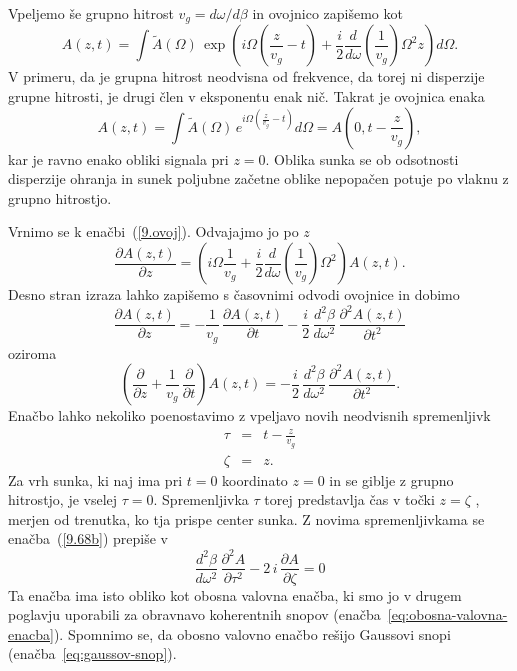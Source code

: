 Vpeljemo še grupno hitrost $v_g = d\omega/d\beta$ in ovojnico zapišemo kot
\begin{equation}
 A(z,t) = \int \tilde{A}(\Omega)\, \exp \left(i \Omega \left(\frac{z}{v_g}-t\right)+ 
 \frac{i}{2}\frac{d}{d\omega}
 \left(\frac{1}{v_g}\right)\Omega^2 z\right) d\Omega.
 \label{9.ovoj}
\end{equation}
V primeru, da je grupna hitrost neodvisna od frekvence, da torej ni disperzije grupne hitrosti, 
je drugi člen v eksponentu enak nič. Takrat je ovojnica enaka 
\begin{equation}
  A(z,t) = \int \tilde{A}(\Omega)\, e^{i \Omega \left(\frac{z}{v_g}-t\right)} d\Omega =
  A\left(0,t-\frac{z}{v_g}\right),
\end{equation}
kar je ravno enako obliki signala pri $z = 0$. Oblika sunka se ob odsotnosti 
disperzije ohranja in sunek 
poljubne začetne oblike nepopačen potuje po vlaknu z grupno hitrostjo. 

Vrnimo se k enačbi~(\ref{9.ovoj}). Odvajajmo jo po $z$ 
\begin{equation}
 \frac{\partial A(z,t)}{\partial z} = \left( i\Omega \frac{1}{v_g}+ \frac{i}{2}
\frac{d}{d\omega} \left(\frac{1}{v_g}\right) \Omega^2 \right) A(z,t).
\label{9.67}
\end{equation}
Desno stran izraza lahko zapišemo s časovnimi odvodi ovojnice in dobimo 
\begin{equation}
\frac{\partial A(z,t)}{\partial z} = -\frac{1}{v_{g}}\,\frac{\partial A (z,t)}{\partial t}
-\frac{i}{2}\,\frac{d^{2}\beta}{d\omega^{2}}\,\frac{\partial^{2}A\left(z,t\right)}{\partial t^{2}}
\label{9.68} 
\end{equation}
oziroma
\begin{equation}
\left(\frac{\partial}{\partial z} + \frac{1}{v_{g}}\,\frac{\partial }{\partial t}\right)A (z,t) = 
-\frac{i}{2}\,\frac{d^{2}\beta}{d\omega^{2}}\,\frac{\partial^{2}A\left(z,t\right)}{\partial t^{2}}.
\label{9.68b} 
\end{equation}
Enačbo lahko nekoliko poenostavimo z vpeljavo novih neodvisnih spremenljivk
\begin{eqnarray}
\tau & = & t-\frac{z}{v_{g}}\nonumber \\
\zeta & = & z.
\label{9.70}
\end{eqnarray}
Za vrh sunka, ki naj ima pri $t=0$ koordinato $z=0$ in se giblje
z grupno hitrostjo, je vselej $\tau=0$. Spremenljivka $\tau$ torej predstavlja
čas v točki $z=\zeta$ , merjen od trenutka, ko tja
prispe center sunka. Z novima spremenljivkama se enačba~(\ref{9.68b})
prepiše v 
\begin{equation}
\frac{d^{2}\beta}{d\omega^{2}}\,\frac{\partial^{2}A}{\partial\tau^{2}}-
2\, i\,\frac{\partial A}{\partial\zeta}=0
\label{9.71}
\end{equation}
Ta enačba ima isto obliko kot obosna valovna enačba, ki smo jo v
drugem poglavju uporabili za obravnavo koherentnih 
snopov (enačba~\ref{eq:obosna-valovna-enacba}). Spomnimo se, da 
obosno valovno enačbo rešijo Gaussovi snopi (enačba~\ref{eq:gaussov-snop}). 


